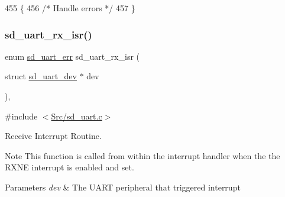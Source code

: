 \begin{DoxyCode}
455 \{
456   \textcolor{comment}{/* Handle errors */}
457 \}
\end{DoxyCode}
\mbox{\label{group___s_d___u_a_r_t_ga54b5b3ca4f31885d84714a36f6fcc5e3}} 
\subsubsection{\texorpdfstring{sd\+\_\+uart\+\_\+rx\+\_\+isr()}{sd\_uart\_rx\_isr()}}
{\footnotesize\ttfamily enum \mbox{\hyperlink{group___s_d___u_a_r_t___types_gaff649a266fb34035c10733370c4fd104}{sd\+\_\+uart\+\_\+err}} sd\+\_\+uart\+\_\+rx\+\_\+isr (\begin{DoxyParamCaption}\item[{struct \mbox{\hyperlink{structsd__uart__dev}{sd\+\_\+uart\+\_\+dev}} $\ast$}]{dev }\end{DoxyParamCaption})\hspace{0.3cm}{\ttfamily [inline]}, {\ttfamily [static]}}



{\ttfamily \#include $<$\mbox{\hyperlink{sd__uart_8c}{Src/sd\+\_\+uart.\+c}}$>$}



Receive Interrupt Routine. 

\begin{DoxyNote}{Note}
This function is called from within the interrupt handler when the the R\+X\+NE interrupt is enabled and set.
\end{DoxyNote}

\begin{DoxyParams}{Parameters}
{\em dev} & The U\+A\+RT peripheral that triggered interrupt \\
\hline
\end{DoxyParams}

